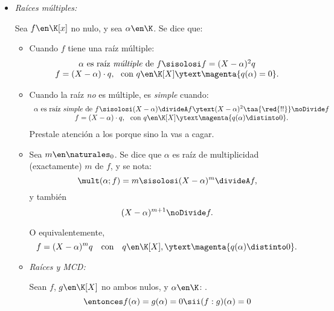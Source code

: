 \begin{itemize}
  \item \hypertarget{teoria-7:raicesMultiples}{\textit{Raíces múltiples:}}\par
        Sea $f \en \K[x]$ no nulo, y sea $\alpha \en \K$. Se dice que:
        \begin{itemize}[label=\teoriaBulletMeh]
          \item Cuando $f$ tiene una raíz múltiple:
                $$
                  \begin{array}{c}
                    \alpha\text{ es raíz \textit{múltiple} de } f \sisolosi f = (X - \alpha)^2 q \\
                    f = (X - \alpha)\cdot q,\ \text{ con } q \en \K[X]  \ytext  \magenta{ q(\alpha) = 0}.
                  \end{array}
                $$

          \item Cuando la raíz \textit{no} es múltiple, es \textit{simple} cuando:
                $$
                  \begin{array}{c}
                    \alpha \text{ es raíz \textit{simple} de } f \sisolosi (X - \alpha) \divideA f
                    \ytext (X - \alpha)^2 \taa{\red{!!}}\noDivide f \\
                    f = (X - \alpha)\cdot q,\ \text{ con } q \en \K[X]  \ytext  \magenta{ q(\alpha) \distinto 0}.
                  \end{array}
                $$
                Prestale atención a los \red{!} porque sino la vas a cagar.

          \item Sea $m \en \naturales_0$. Se dice que $\alpha$ es raíz de multiplicidad (exactamente)
                $m$ de $f$, y se nota:
                $$
                  \mult(\alpha;f) = m \sisolosi (X - \alpha)^m \divideA f,
                $$
                y también
                $$
                  (X - \alpha)^{m+1} \noDivide f.
                $$

                O equivalentemente,
                $$
                  f = (X - \alpha)^m q \quad \text{con} \quad q \en \K[X],  \ytext  \magenta{q (\alpha) \distinto 0}.
                $$

          \item \textit{Raíces y MCD:}\par
                Sean $f$, $g \en \K[X]$ no ambos nulos, y $\alpha \en \K$:
                .
                $$
                  \entonces f(\alpha) = g(\alpha) = 0 \sii (f:g)(\alpha) = 0
                $$


\end{itemize}
\end{itemize}

